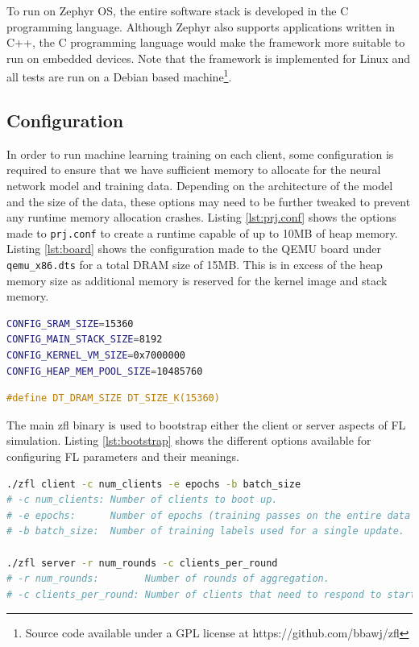 \documentclass[12pt]{article}
\begin{document}
To run on Zephyr OS, the entire software stack is developed in the C programming language. Although
Zephyr also supports applications written in C++, the C programming language would make the framework
more suitable to run on embedded devices. Note that the framework is implemented for Linux and all tests are run
on a Debian based machine\footnote{Source code available under a
GPL license at https://github.com/bbawj/zfl}.

\subsection{Configuration}
In order to run machine learning training on each client, some configuration is required to ensure
that we have sufficient memory to allocate for the neural network model and training data. Depending
on the architecture of the model and the size of the data, these options may need to be further tweaked to
prevent any runtime memory allocation crashes. Listing \ref{lst:prj.conf} shows the options made to
\verb|prj.conf| to create a runtime capable of up to 10MB of heap memory. Listing
\ref{lst:board} shows
the configuration made to the QEMU board under \verb|qemu_x86.dts| for a total DRAM size of 15MB.
This is in excess of the heap memory size as additional memory is reserved for the kernel image and
stack memory.\\

\begin{minipage}[b][][b]{.45\textwidth}
\begin{lstlisting}[language=bash,caption={Zephyr prj.conf},label={lst:prj.conf}]
CONFIG_SRAM_SIZE=15360
CONFIG_MAIN_STACK_SIZE=8192
CONFIG_KERNEL_VM_SIZE=0x7000000
CONFIG_HEAP_MEM_POOL_SIZE=10485760
\end{lstlisting}
\end{minipage}\hfill
\begin{minipage}[b][][b]{.45\textwidth}
\begin{lstlisting}[language=C,caption={QEMU board.dts},label={lst:board}]
#define DT_DRAM_SIZE DT_SIZE_K(15360)
\end{lstlisting}
\end{minipage}

The main zfl binary is used to bootstrap either the client or server aspects of FL simulation.
Listing \ref{lst:bootstrap} shows the different options available for configuring FL parameters and
their meanings.
\begin{lstlisting}[language=bash,caption={The main zfl binary},label={lst:bootstrap}]
./zfl client -c num_clients -e epochs -b batch_size
# -c num_clients: Number of clients to boot up.
# -e epochs:      Number of epochs (training passes on the entire data set).
# -b batch_size:  Number of training labels used for a single update.

./zfl server -r num_rounds -c clients_per_round
# -r num_rounds:        Number of rounds of aggregation.
# -c clients_per_round: Number of clients that need to respond to start a round.
\end{lstlisting}
\end{document}

